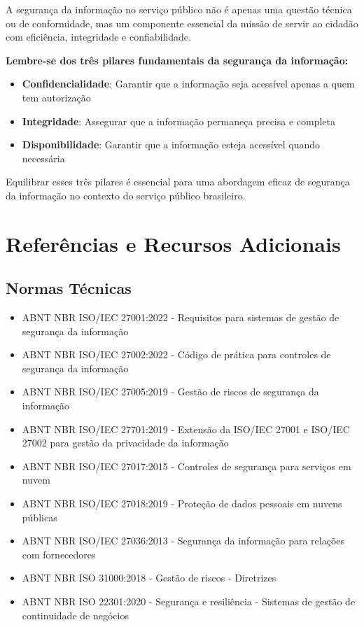 \documentclass[12pt,a4paper]{report}
\begin{document}
\begin{notebox}
A segurança da informação no serviço público não é apenas uma questão técnica ou de conformidade, mas um componente essencial da missão de servir ao cidadão com eficiência, integridade e confiabilidade.
\end{notebox}

\begin{infobox}
\textbf{Lembre-se dos três pilares fundamentais da segurança da informação:}

\begin{itemize}
  \item \textbf{Confidencialidade}: Garantir que a informação seja acessível apenas a quem tem autorização
  \item \textbf{Integridade}: Assegurar que a informação permaneça precisa e completa
  \item \textbf{Disponibilidade}: Garantir que a informação esteja acessível quando necessária
\end{itemize}

Equilibrar esses três pilares é essencial para uma abordagem eficaz de segurança da informação no contexto do serviço público brasileiro.
\end{infobox}

\chapter{Referências e Recursos Adicionais}

\section{Normas Técnicas}

\begin{itemize}
  \item ABNT NBR ISO/IEC 27001:2022 - Requisitos para sistemas de gestão de segurança da informação
  \item ABNT NBR ISO/IEC 27002:2022 - Código de prática para controles de segurança da informação
  \item ABNT NBR ISO/IEC 27005:2019 - Gestão de riscos de segurança da informação
  \item ABNT NBR ISO/IEC 27701:2019 - Extensão da ISO/IEC 27001 e ISO/IEC 27002 para gestão da privacidade da informação
  \item ABNT NBR ISO/IEC 27017:2015 - Controles de segurança para serviços em nuvem
  \item ABNT NBR ISO/IEC 27018:2019 - Proteção de dados pessoais em nuvens públicas
  \item ABNT NBR ISO/IEC 27036:2013 - Segurança da informação para relações com fornecedores
  \item ABNT NBR ISO 31000:2018 - Gestão de riscos - Diretrizes
  \item ABNT NBR ISO 22301:2020 - Segurança e resiliência - Sistemas de gestão de continuidade de negócios
\end{itemize}
\end{document}
